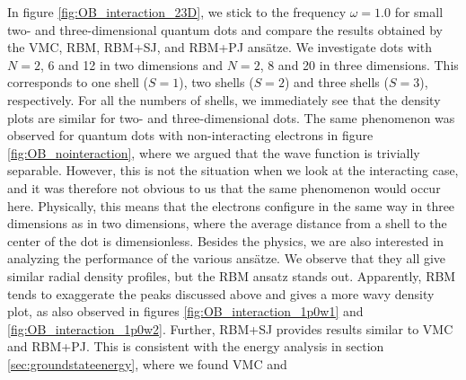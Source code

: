 In figure \eqref{fig:OB_interaction_23D}, we stick to the frequency $\omega=1.0$ for small two- and three-dimensional quantum dots and compare the results obtained by the VMC, RBM, RBM+SJ, and RBM+PJ ansätze. We investigate dots with $N=2$, 6 and 12 in two dimensions and $N=2$, 8 and 20 in three dimensions. This corresponds to one shell ($S=1$), two shells ($S=2$) and three shells ($S=3$), respectively. For all the numbers of shells, we immediately see that the density plots are similar for two- and three-dimensional dots. The same phenomenon was observed for quantum dots with non-interacting electrons in figure \eqref{fig:OB_nointeraction}, where we argued that the wave function is trivially separable. However, this is not the situation when we look at the interacting case, and it was therefore not obvious to us that the same phenomenon would occur here. Physically, this means that the electrons configure in the same way in three dimensions as in two dimensions, where the average distance from a shell to the center of the dot is dimensionless. Besides the physics, we are also interested in analyzing the performance of the various ansätze. We observe that they all give similar radial density profiles, but the RBM ansatz stands out. Apparently, RBM tends to exaggerate the peaks discussed above and gives a more wavy density plot, as also observed in figures \eqref{fig:OB_interaction_1p0w1} and \eqref{fig:OB_interaction_1p0w2}. Further, RBM+SJ provides results similar to VMC and RBM+PJ. This is consistent with the energy analysis in section \ref{sec:groundstateenergy}, where we found VMC and
